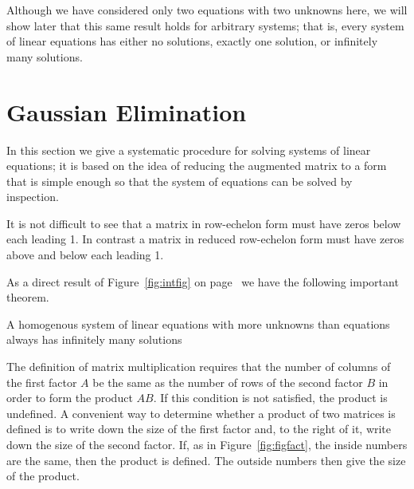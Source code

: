 Although we have considered only two equations with two unknowns here,
we will show later that this same result holds for arbitrary systems;
that is, every system of linear equations has either no solutions,
exactly one solution, or infinitely many solutions.


\section{Gaussian Elimination}

In this section we give a systematic procedure for solving systems of
linear equations; it is based on the idea of reducing the augmented
matrix to a form that is simple enough so that the system of equations
can be solved by inspection.

\begin{remark}
It is not difficult to see that a matrix in row-echelon form must have
zeros below each leading 1.  In contrast a matrix in reduced row-echelon
form must have zeros above and below each leading 1.
\end{remark}

%
%

As a direct result of Figure~\ref{fig:intfig} on
page~\pageref{fig:intfig} we have the following important theorem.

\begin{theorem} 
A homogenous system of linear equations with more unknowns than
equations always has infinitely many solutions
\end{theorem}

The definition of matrix multiplication requires that the number of columns
of the first factor $A$ be the same as the number of rows of the second
factor $B$ in order to form the product $AB$.  If this condition is not
satisfied, the product is undefined.  A convenient way to determine
whether a product of two matrices is defined is to write down the size
of the first factor and, to the right of it, write down the size of the
second factor.  If, as in Figure~\ref{fig:figfact}, the inside numbers
are the same, then the product is defined.  The outside numbers then
give the size of the product.  

